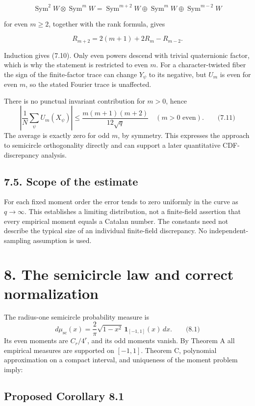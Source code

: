 \documentclass[
  11pt,
  a4paper,
]{article}
\begin{document}
\[
\operatorname{Sym}^2W\otimes\operatorname{Sym}^mW
=\operatorname{Sym}^{m+2}W\oplus\operatorname{Sym}^mW\oplus\operatorname{Sym}^{m-2}W
\]

for even \(m\geq2\), together with the rank formula, gives

\[
R_{m+2}=2(m+1)+2R_m-R_{m-2}.
\]

Induction gives (7.10). Only even powers descend with trivial
quaternionic factor, which is why the statement is restricted to even
\(m\). For a character-twisted fiber the sign of the finite-factor trace
can change \(Y_\psi\) to its negative, but \(U_m\) is even for even
\(m\), so the stated Fourier trace is unaffected.

There is no punctual invariant contribution for \(m>0\), hence \[
\left|\frac1N\sum_\psi U_m(X_\psi)\right|
\le\frac{m(m+1)(m+2)}{12\sqrt q}
\quad(m>0\text{ even}).
\qquad \text{(7.11)}
\] The average is exactly zero for odd \(m\), by symmetry. This
expresses the approach to semicircle orthogonality directly and can
support a later quantitative CDF-discrepancy analysis.

\subsection{7.5. Scope of the estimate}\label{scope-of-the-estimate}

For each fixed moment order the error tends to zero uniformly in the
curve as \(q\to\infty\). This establishes a limiting distribution, not a
finite-field assertion that every empirical moment equals a Catalan
number. The constants need not describe the typical size of an
individual finite-field discrepancy. No independent-sampling assumption
is used.

\section{8. The semicircle law and correct
normalization}\label{the-semicircle-law-and-correct-normalization}

The radius-one semicircle probability measure is \[
d\mu_{\mathrm{sc}}(x)=\frac2\pi\sqrt{1-x^2}\,\mathbf1_{[-1,1]}(x)\,dx.
\qquad \text{(8.1)}
\] Its even moments are \(C_r/4^r\), and its odd moments vanish. By
Theorem A all empirical measures are supported on \([-1,1]\). Theorem C,
polynomial approximation on a compact interval, and uniqueness of the
moment problem imply:

\subsection{Proposed Corollary 8.1}\label{proposed-corollary-8.1}
\end{document}
